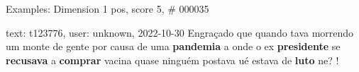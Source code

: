 \begin{frame}{Examples: Dimension 1 pos, score 5, \# 000035}
\footnotesize
\begin{exampleblock}{text: t123776, user: unknown, 2022-10-30}
Engraçado que quando tava morrendo um monte de gente por causa de uma 
\textbf{pandemia} a onde o ex \textbf{presidente} se \textbf{recusava} a 
\textbf{comprar} vacina quase ninguém postava ué estava de \textbf{luto} ne? ! 
\end{exampleblock}
\end{frame}
